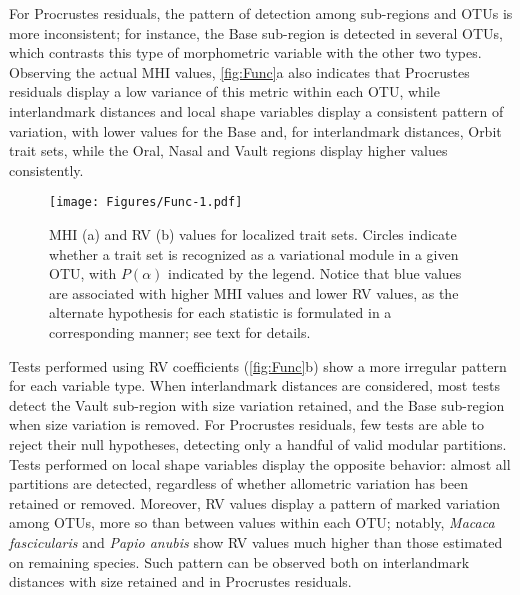 \documentclass[12pt,twoside]{report}
\begin{document}
For Procrustes residuals, the pattern of detection among sub-regions and
OTUs is more inconsistent; for instance, the Base sub-region is detected
in several OTUs, which contrasts this type of morphometric variable with
the other two types. Observing the actual MHI values,
\autoref{fig:Func}a also indicates that Procrustes residuals display a
low variance of this metric within each OTU, while interlandmark
distances and local shape variables display a consistent pattern of
variation, with lower values for the Base and, for interlandmark
distances, Orbit trait sets, while the Oral, Nasal and Vault regions
display higher values consistently.

\begin{figure}[htbp]
\centering
\texttt{[image: Figures/Func-1.pdf]}
\caption{MHI (a) and RV (b) values for localized trait sets. Circles
indicate whether a trait set is recognized as a variational module in a
given OTU, with $P(\alpha)$ indicated by the legend. Notice that blue
values are associated with higher MHI values and lower RV values, as the
alternate hypothesis for each statistic is formulated in a corresponding
manner; see text for details. \label{fig:Func}}
\end{figure}

Tests performed using RV coefficients (\autoref{fig:Func}b) show a more
irregular pattern for each variable type. When interlandmark distances
are considered, most tests detect the Vault sub-region with size
variation retained, and the Base sub-region when size variation is
removed. For Procrustes residuals, few tests are able to reject their
null hypotheses, detecting only a handful of valid modular partitions.
Tests performed on local shape variables display the opposite behavior:
almost all partitions are detected, regardless of whether allometric
variation has been retained or removed. Moreover, RV values display a
pattern of marked variation among OTUs, more so than between values
within each OTU; notably, \emph{Macaca fascicularis} and \emph{Papio
anubis} show RV values much higher than those estimated on remaining
species. Such pattern can be observed both on interlandmark distances
with size retained and in Procrustes residuals.
\end{document}
